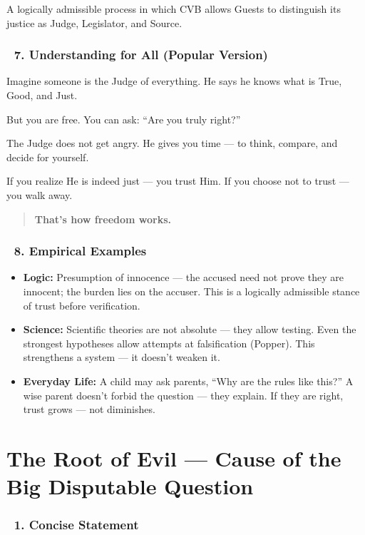 \documentclass[12pt]{article}
\begin{document}
A logically admissible process in which CVB allows Guests to distinguish its justice as Judge, Legislator, and Source.

\subsubsection*{🔹 7. Understanding for All (Popular Version)}

Imagine someone is the Judge of everything. He says he knows what is True, Good, and Just.

But you are free. You can ask: ``Are you truly right?''

The Judge does not get angry. He gives you time — to think, compare, and decide for yourself.

If you realize He is indeed just — you trust Him. If you choose not to trust — you walk away.

\begin{quote}
\textbf{That’s how freedom works.}
\end{quote}

\subsubsection*{🔹 8. Empirical Examples}

\begin{itemize}
\item \textbf{Logic:} Presumption of innocence — the accused need not prove they are innocent; the burden lies on the accuser. This is a logically admissible stance of trust before verification.

\item \textbf{Science:} Scientific theories are not absolute — they allow testing. Even the strongest hypotheses allow attempts at falsification (Popper). This strengthens a system — it doesn’t weaken it.

\item \textbf{Everyday Life:} A child may ask parents, ``Why are the rules like this?'' A wise parent doesn’t forbid the question — they explain. If they are right, trust grows — not diminishes.
\end{itemize}


\section*{\text{[25.1]} The Root of Evil — Cause of the Big Disputable Question}

\subsubsection*{🔹 1. Concise Statement}
\end{document}
